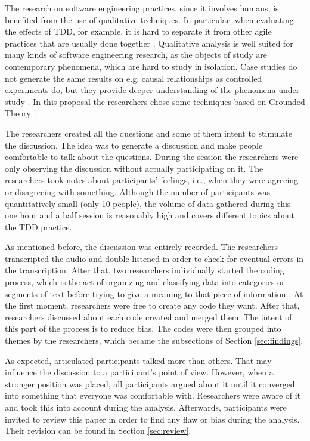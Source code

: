 The research on software engineering practices, since it involves humans, is
benefited from the use of qualitative techniques. In particular, when evaluating
the effects of TDD, for example, it is hard to separate it from other agile
practices that are usually done together \cite{agile-manifesto}
\cite{guidelines-qualitative}.
Qualitative analysis is well suited for many kinds of software engineering
research, as the objects of study are contemporary phenomena, which are hard to
study in isolation.
Case studies do not generate the same results on e.g. causal relationships as
controlled experiments do, but they provide deeper understanding of the
phenomena under study \cite{guidelines-qualitative}.
In this proposal the researchers chose some techniques based on Grounded
Theory \cite{grounded-theory}.

The researchers created all the questions and some of them intent to stimulate
the discussion. The idea was to generate a discussion and make people
comfortable to talk about the questions.
During the session the researchers were only observing the discussion without
actually participating on it.
The researchers took notes about participants' feelings, i.e., when they
were agreeing or disagreeing with something.
Although the number of participants was quantitatively small (only 10 people),
the volume of data gathered during this one hour and a half session is
reasonably high and covers different topics about the TDD practice.

As mentioned before, the discussion was entirely recorded. The researchers
transcripted the audio and double listened in order to check for eventual errors
in the transcription. After that, two researchers individually started the
coding process, which is the act of organizing and classifying data into
categories or segments of text before trying to give a meaning to that piece of
information \cite{rossman}. At the first moment, researchers were free to
create any code they want. After that, researchers discussed about each code
created and merged them. The intent of this part of the process is to reduce
bias.
The codes were then grouped into themes by the researchers, which became the
subsections of Section \ref{sec:findings}.

As expected, articulated participants talked more than others. That may
influence the discussion to a participant's point of view. However, when a
stronger position was placed, all participants argued about it until it
converged into something that everyone was comfortable with. Researchers were
aware of it and took this into account during the analysis.
Afterwards, participants were invited to review this paper in order to find any
flaw or bias during the analysis. Their revision can be found in Section
\ref{sec:review}.

